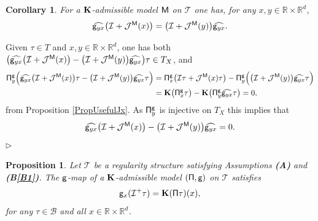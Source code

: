 \documentclass[10pt, reqno]{amsart}
\numberwithin{subsection}{section}
\numberwithin{subsubsection}{subsection}
\numberwithin{equation}{section} %
\newenvironment{Dem}[1][\unskip]{%
    \begin{list}{\hspace{1.15cm}{\sf \textbf{{\small Proof #1 --}}}}{%
        \setlength{\topsep}{0pt}%
        \setlength{\leftmargin}{0pt}%
        \setlength{\rightmargin}{0pt}%
        \setlength{\listparindent}{0pt}%
        \setlength{\itemindent}{0pt}%
        \setlength{\parsep}{0pt}%
        \addtolength{\leftmargin}{0pt}%
        \addtolength{\rightmargin}{0pt}%
    } \item }{\hfill $\rhd$\end{list}\smallskip}
\theoremstyle{mystyle}
\newtheorem{cor}[thm]{\hspace{-0.15cm}  {Corollary} }%
\newtheorem{prop}[thm]{\hspace{-0.13cm} {Proposition}}%
\theoremstyle{mystyle2}
\theoremstyle{mystyle3}
\newcommand{\REFA}{\textbf{\textsf{(A)}}}
\newcommand{\refB}[1]{\textbf{\textsf{(B\ref{#1})}}}
\newcommand\bbR{\mathbb{R}}
\newcommand{\mcB}{\mathcal{B}}
\newcommand{\mcI}{\mathcal{I}}
\newcommand{\mcJ}{\mathcal{J}}
\begin{document}
\medskip

\begin{cor} \label{CorIdentityAdmissibility}
For a $\bf K$-admissible model $\sf M$ on $\mathscr{T}$ one has, for any $x,y\in\bbR\times\bbR^d$, 
\begin{equation} \label{EqCommutationRelation}
\widehat{{\sf g}_{yx}}\big(\mcI + \mcJ^{\sf M}(x)\big) = \big(\mcI + \mcJ^{\sf M}(y)\big)\widehat{{\sf g}_{yx}}.
\end{equation}
\end{cor}

\medskip

\begin{Dem}
Given $\tau\in T$ and $x,y\in\bbR\times\bbR^d$, one has both $\big(\widehat{{\sf g}_{yx}}\big(\mcI + \mcJ^{\sf M}(x)\big) - \big(\mcI + \mcJ^{\sf M}(y)\big)\widehat{{\sf g}_{yx}}\big)\tau\in T_X$, and 
\begin{equation*} \begin{split}
{\sf \Pi}^{\sf g}_y\Big(\widehat{{\sf g}_{yx}}\big(\mcI + \mcJ^{\sf M}(x)\big)\tau - \big(\mcI + \mcJ^{\sf M}(y)\big)\widehat{{\sf g}_{yx}}\tau\Big) &= {\sf \Pi}^{\sf g}_x\big(\mcI\tau + \mcJ^{\sf M}(x)\tau\big) - {\sf \Pi}^{\sf g}_y\Big(\big(\mcI + \mcJ^{\sf M}(y)\big)\widehat{{\sf g}_{yx}}\tau\Big)  \\
&= {\bf K}\big({\sf \Pi}_x^{\sf g}\tau\big) - {\bf K}\big({\sf \Pi}_y^{\sf g}\widehat{{\sf g}_{yx}}\tau\big) = 0,
\end{split} \end{equation*}
from Proposition \ref{PropUsefulJx}. As ${\sf \Pi}_y^{\sf g}$ is injective on $T_X$ this implies that 
$$
\widehat{{\sf g}_{yx}}\big(\mcI + \mcJ^{\sf M}(x)\big) - \big(\mcI + \mcJ^{\sf M}(y)\big)\widehat{{\sf g}_{yx}} = 0.
$$
\end{Dem}

\medskip

\begin{prop} \label{PropLinkGPiForAdmissibleModels}
Let $\mathscr{T}$ be a regularity structure satisfying Assumptions {\REFA} and \refB{B1}. The $\sf g$-map of a $\bf K$-admissible model $\sf (\Pi, g)$ on $\mathscr{T}$ satisfies
$$
{\sf g}_x(\mcI^+\tau) = {\bf K}({\sf\Pi}\tau)(x),
$$
for any $\tau\in\mcB$ and all $x\in\bbR\times\bbR^d$.
\end{prop}

\medskip
\end{document}

